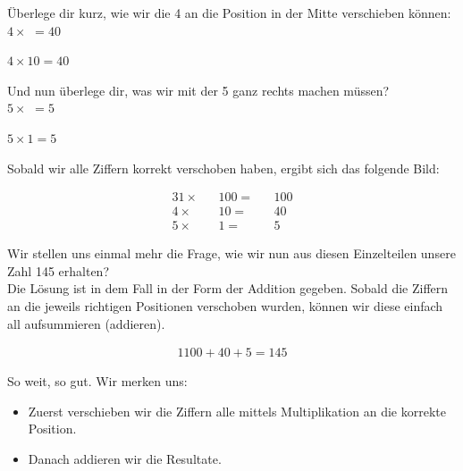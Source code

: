 \begin{exerciseseries}[columns=1,solsubrule=\hrule]{}
    \begin{exercise}
        Überlege dir kurz, wie wir die 4 an die Position in der Mitte verschieben können:\\
        $4 \times $\underline{\hspace{1cm}} $ = 40$
    \end{exercise}
    \begin{solution}
        $4 \times 10 = 40$
    \end{solution}

    \begin{exercise}
        Und nun überlege dir, was wir mit der 5 ganz rechts machen müssen?\\
        $5 \times $\underline{\hspace{1cm}} $ = 5$
    \end{exercise}
    \begin{solution}
        $5 \times 1 = 5$
    \end{solution}
\end{exerciseseries}

Sobald wir alle Ziffern korrekt verschoben haben, ergibt sich das folgende Bild:

\begin{alignat*}{3}
    1 \times && 100 = && 100\\
    4 \times && 10 = && 40\\
    5 \times && 1 = && 5
\end{alignat*}

Wir stellen uns einmal mehr die Frage, wie wir nun aus diesen Einzelteilen unsere Zahl 145 erhalten?\\
Die Lösung ist in dem Fall in der Form der Addition gegeben. Sobald die Ziffern an die jeweils richtigen Positionen
verschoben wurden, können wir diese einfach all aufsummieren (addieren).

\begin{alignat*}{1}
    100 + 40 + 5 = 145
\end{alignat*}

So weit, so gut. Wir merken uns:
\begin{itemize}
    \item Zuerst verschieben wir die Ziffern alle mittels Multiplikation an die korrekte Position.
    \item Danach addieren wir die Resultate.
\end{itemize}

